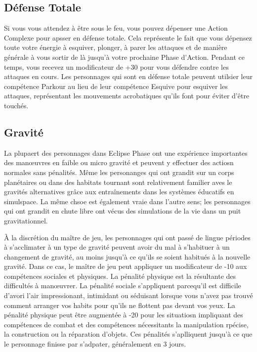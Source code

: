 \subsection{Défense Totale} \label{sec:full-defense} 

Si vous vous attendez à être sous le feu, vous pouvez dépenser une Action Complexe pour apsser en défense totale. Cela représente le fait que vous dépensez toute votre énergie à esquiver, plonger, à parer les attaques et de manière générale à vous sortir de là jusqu'à votre prochaine Phase d'Action. Pendant ce temps, vous recevez un modificateur de +30 pour vous défendre contre les attaques en cours. Les personnages qui sont en défense totale peuvent utilsier leur compétence Parkour au lieu de leur compétence Esquive pour esquiver les attaques, représentant les mouvements acrobatiques qu'ils font pour éviter d'être touchés. 

\subsection{Gravité} \label{sec:gravity} 

La plupaert des personnages dans Eclipse Phase ont une expérience importantes des manœuvres en faible ou micro gravité et peuvent y effectuer des actiosn normales sans pénalités. Même les personanges qui ont grandit sur un corps planétaires ou dans des habitats tournant sont relativement familier aves le gravités alternatives grâce aux entraînements dans les systèmes éducatifs en simulspace. La même chsoe est également vraie dans l'autre sens; les personnages qui ont grandit en chute libre ont vécus des simulations de la vie dans un puit gravitationnel. 

À la discrétion du maître de jeu, les personnages qui ont passé de lingue périodes à s'acclimater à un type de gravité peuvent avoir du mal à s'habituer à un changement de gravité, au moins jusqu'à ce qu'ils se soient habitués à la nouvelle gravité. Dans ce cas, le maître de jeu peut appliquer un modificateur de -10 aux compétences sociales et physiques. La pénalité physique est la résultante des difficultés à manœuvrer. La pénalité sociale s'appliquent parcequ'il est difficile d'avori l'air impressionant, intimidant ou séduisant lorsque vous n'avez pas trouvé comment arranger vos habits pour qu'ils ne flottent pas devant vos yeux. La pénalité physique peut être augmentée à -20 pour les situatiosn impliquant des compétences de combat et des compétences nécessitants la manipulation rpécise, la construction ou la réparation d'objets. Ces pénalités s'aplliquent jusqu'à ce que le personnage finisse par s'adpater, généralement en 3 jours. 


